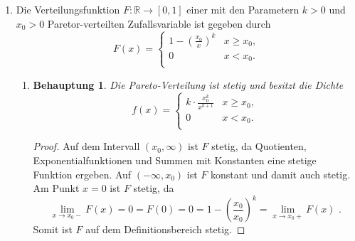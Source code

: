 \documentclass[a4paper]{scrartcl}
\newtheorem*{behaupt}{Behauptung}
\def \blattnr {11}
\begin{document}
\begin{enumerate}[label=\bfseries \blattnr.\arabic*]
    \pagebreak
    \item %
        Die Verteilungsfunktion $F\colon \mathbb{R} \to [0,1]$ einer mit den
        Parametern $k > 0$ und $x_0 > 0$ Paretor-verteilten Zufallsvariable 
        ist gegeben durch
        \begin{equation*}
            F(x) =
            \begin{cases}
                1 - \left( \frac{x_0}{x} \right)^k & x \geq x_0, \\
                0 & x < x_0. \\
            \end{cases}
        \end{equation*}
        \begin{enumerate}
            \item
                \begin{behaupt}
                    Die Pareto-Verteilung ist stetig und besitzt die Dichte
                    \begin{equation}
                        f(x) =
                        \begin{cases}
                            k \cdot \frac{x_0^k}{x^{k+1}} & x \geq x_0, \\
                            0 & x < x_0. \\
                        \end{cases}
                        \label{eq:dichte}
                    \end{equation}
                \end{behaupt}
                \begin{proof}
                    Auf dem Intervall $(x_0,\infty)$ ist $F$ stetig, da
                    Quotienten, Exponentialfunktionen und Summen mit Konstanten
                    eine stetige Funktion ergeben.
                    Auf $(-\infty,x_0)$ ist $F$ konstant und damit auch stetig.
                    Am Punkt $x = 0$ ist $F$ stetig, da
                    \begin{equation*}
                        \lim_{x \to x_0-} F(x)
                        = 0
                        = F(0)
                        = 0
                        = 1 - \left( \frac{x_0}{x_0} \right)^k
                        = \lim_{x \to x_0+} F(x)
                        \text{ .}
                    \end{equation*}
                    Somit ist $F$ auf dem Definitionsbereich stetig.


\end{proof}
\end{enumerate}
\end{enumerate}
\end{document}
